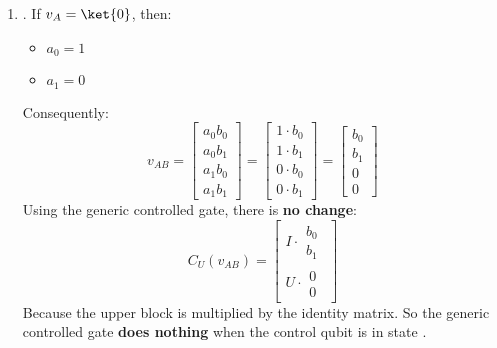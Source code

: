 \begin{enumerate}
    \item {}. If $v_{A} = \ket{0}$, then:
    \begin{itemize}
        \item $a_{0} = 1$
        \item $a_{1} = 0$
    \end{itemize}
    Consequently:
    \begin{equation*}
        v_{AB} = \begin{bmatrix}
            a_0 b_0 \\
            a_0 b_1 \\
            a_1 b_0 \\
            a_1 b_1
        \end{bmatrix}
        =
        \begin{bmatrix}
            1 \cdot b_0 \\
            1 \cdot b_1 \\
            0 \cdot b_0 \\
            0 \cdot b_1
        \end{bmatrix}
        =
        \begin{bmatrix}
            b_0 \\
            b_1 \\
              0 \\
              0
        \end{bmatrix}
    \end{equation*}
    Using the generic controlled gate, there is \textbf{no change}:
    \begin{equation*}
        C_{U}\left(v_{AB}\right) =
        \begin{bmatrix}
            I \cdot \begin{matrix} b_{0} \\ b_{1} \end{matrix} \\
            U \cdot \begin{matrix} 0 \\ 0 \end{matrix}
        \end{bmatrix}
    \end{equation*}
    Because the upper block is multiplied by the identity matrix. So the generic controlled gate \textbf{does nothing} when the control qubit is in state .


\end{enumerate}
